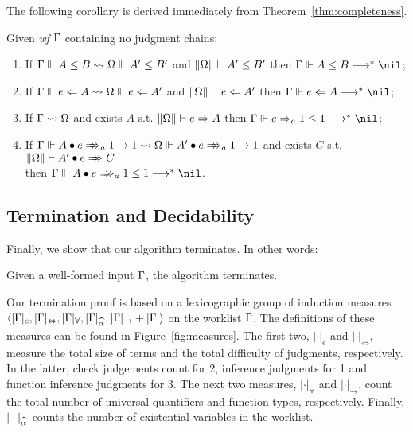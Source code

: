 The following corollary is derived immediately from Theorem~\ref{thm:completeness}.
\begin{corollary}
Given \emph{wf }$\Gamma$ containing no judgment chains:
\begin{enumerate}
    \item If $\Gamma \Vdash A \le B \rightsquigarrow \Omega \Vdash A' \le B'$ and $\|\Omega\| \vdash A' \le B'$
        then $\Gm \Vdash A \le B \redto \nil$;
    \item If $\Gamma \Vdash e \Leftarrow A \rightsquigarrow \Omega \Vdash e \Leftarrow A'$ and $\|\Omega\| \vdash e \Leftarrow A'$
        then $\Gm \Vdash e \Lto A \redto \nil$;
    \item If $\Gamma \rightsquigarrow \Omega$ and exists $A$ s.t. $\|\Omega\| \vdash e \Rightarrow A$
        then $\Gm \Vdash e \To_a 1 \le 1 \redto \nil$;
    \item If $\Gm \Vdash \appInfAlg{A}{e}[a][1 \to 1] \sto \Om \Vdash \appInfAlg{A'}{e}[a][1 \to 1]$
        and exists $C$ s.t. $\|\Om\| \vdash \appInf{A'}{e}{C}$
        \\
        then $\Gm \Vdash \appInfAlg{A}{e}[a][1 \le 1] \redto \nil$.
\end{enumerate}
\end{corollary}

\subsection{Termination and Decidability}

Finally, we show that our algorithm terminates. In other words:
\begin{theorem}[Termination]
Given a well-formed input $\Gamma$, the algorithm terminates.
\end{theorem}
Our termination proof is based on a lexicographic group of induction measures\\
$\langle |\Gm|_e, |\Gm|_\Leftrightarrow, |\Gm|_\forall, |\Gm|_{\al}, |\Gm|_\to + |\Gm| \rangle$
on the worklist $\Gamma$. The definitions of these measures can be found in Figure~\ref{fig:measures}. The first two, 
$|\cdot|_e$ and $|\cdot|_\Leftrightarrow$, measure the total size of terms
and the total difficulty of judgments, respectively. In the latter, check judgements
count for 2, inference judgments for 1 and function inference judgments for 3.
The next two measures, $|\cdot|_\forall$ and $|\cdot|_\to$, count the total number of
universal quantifiers and function types, respectively. Finally,
$|\cdot|_{\al}$ counts the number of existential variables in the worklist.

